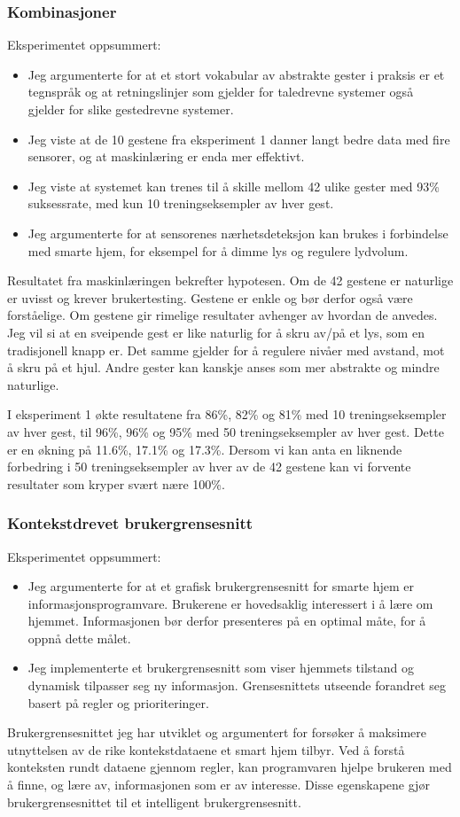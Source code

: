 \subsubsection*{Kombinasjoner}
Eksperimentet oppsummert:
\begin{itemize}
\item Jeg argumenterte for at et stort vokabular av abstrakte gester i praksis er et tegnspråk og at retningslinjer som gjelder for taledrevne systemer også gjelder for slike gestedrevne systemer.
\item Jeg viste at de 10 gestene fra eksperiment 1 danner langt bedre data med fire sensorer, og at maskinlæring er enda mer effektivt.
\item Jeg viste at systemet kan trenes til å skille mellom 42 ulike gester med 93\% suksessrate, med kun 10 treningseksempler av hver gest.
\item Jeg argumenterte for at sensorenes nærhetsdeteksjon kan brukes i forbindelse med smarte hjem, for eksempel for å dimme lys og regulere lydvolum.
\end{itemize}
Resultatet fra maskinlæringen bekrefter hypotesen. Om de 42 gestene er naturlige er uvisst og krever brukertesting. Gestene er enkle og bør derfor også være forståelige. Om gestene gir rimelige resultater avhenger av hvordan de anvedes. Jeg vil si at en sveipende gest er like naturlig for å skru av/på et lys, som en tradisjonell knapp er. Det samme gjelder for å regulere nivåer med avstand, mot å skru på et hjul. Andre gester kan kanskje anses som mer abstrakte og mindre naturlige.

I eksperiment 1 økte resultatene fra 86\%, 82\% og 81\% med 10 treningseksempler av hver gest, til 96\%, 96\% og 95\% med 50 treningseksempler av hver gest. Dette er en økning på 11.6\%, 17.1\% og 17.3\%. Dersom vi kan anta en liknende forbedring i 50 treningseksempler av hver av de 42 gestene kan vi forvente resultater som kryper svært nære 100\%.\\

\subsubsection*{Kontekstdrevet brukergrensesnitt}
Eksperimentet oppsummert:
\begin{itemize}
\item Jeg argumenterte for at et grafisk brukergrensesnitt for smarte hjem er informasjonsprogramvare. Brukerene er hovedsaklig interessert i å lære om hjemmet. Informasjonen bør derfor presenteres på en optimal måte, for å oppnå dette målet.
\item Jeg implementerte et brukergrensesnitt som viser hjemmets tilstand og dynamisk tilpasser seg ny informasjon. Grensesnittets utseende forandret seg basert på regler og prioriteringer.
\end{itemize}
Brukergrensesnittet jeg har utviklet og argumentert for forsøker å maksimere utnyttelsen av de rike kontekstdataene et smart hjem tilbyr. Ved å forstå konteksten rundt dataene gjennom regler, kan programvaren hjelpe brukeren med å finne, og lære av, informasjonen som er av interesse. Disse egenskapene gjør brukergrensesnittet til et intelligent brukergrensesnitt.\\

